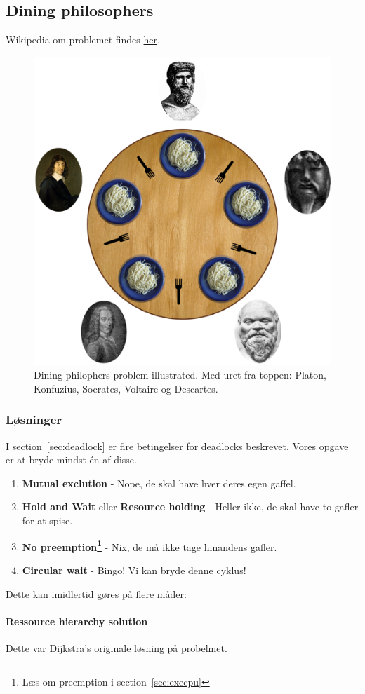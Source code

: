 \subsection{Dining philosophers}
Wikipedia om problemet findes \href{https://en.wikipedia.org/wiki/Dining_philosophers_problem}{her}.

\begin{figure}[h]
	\centering
	\includegraphics[width=0.5\linewidth]{figs/spm2/dining}
	\caption{Dining philophers problem illustrated. Med uret fra toppen: Platon, Konfuzius, Socrates, Voltaire og Descartes.}
	\label{fig:dining}
\end{figure}

\subsubsection{Løsninger}
I section~\ref{sec:deadlock} er fire betingelser for deadlocks beskrevet. Vores opgave er at bryde mindst én af disse.

\begin{enumerate}
	\item \textbf{Mutual exclution} - Nope, de skal have hver deres egen gaffel.
	\item \textbf{Hold and Wait} eller \textbf{Resource holding} - Heller ikke, de skal have to gafler for at spise.
	\item \textbf{No preemption\footnote{Læs om preemption i section~\ref{sec:execpu}}} - Nix, de må ikke tage hinandens gafler.
	\item \textbf{Circular wait} - Bingo! Vi kan bryde denne cyklus!
\end{enumerate}

Dette kan imidlertid gøres på flere måder:

\paragraph{Ressource hierarchy solution}
Dette var Dijkstra's originale løsning på probelmet.

